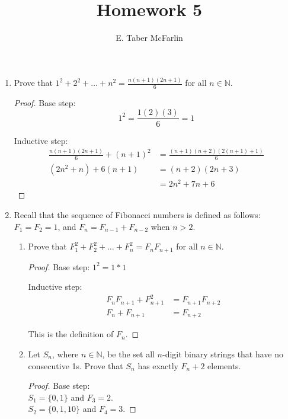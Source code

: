 \documentclass[12pt,a4paper,reqno,parskip=full]{amsart}
\numberwithin{equation}{section}
\theoremstyle{plain}
\theoremstyle{definition}
\begin{document}
\title{Homework 5}

\author{E. Taber McFarlin}

\maketitle

\begin{enumerate}
  \item Prove that $\displaystyle1^2+2^2+\ldots+n^2=\frac{n(n+1)(2n+1)}{6}$ for all $n\in\mathbb{N}$.
        \begin{proof} Base step:
          \[1^2 = \frac{1(2)(3)}{6} = 1\]

          Inductive step:
          \begin{align*}
            \frac{n(n + 1)(2n + 1)}{6} + (n + 1)^2 & = \frac{(n + 1)(n + 2)(2(n + 1) + 1)}{6} \\
            (2n^2 + n) + 6(n + 1)                  & = (n + 2)(2n + 3)                        \\
                                                   & = 2n^2 + 7n + 6
          \end{align*}
        \end{proof}

  \item Recall that the sequence of Fibonacci numbers is defined as follows: $F_1=F_2=1$,
        and $F_n=F_{n-1}+F_{n-2}$ when $n>2$.
        \begin{enumerate}
          \item Prove that $F_1^2+F_2^2+\ldots+F_n^2=F_nF_{n+1}$ for all $n\in\mathbb{N}$.
                \begin{proof} Base step: $1^2 = 1 * 1$

                  Inductive step:
                  \begin{align*}
                    F_nF_{n + 1} + F_{n + 1}^2 & = F_{n + 1}F_{n + 2} \\
                    F_n + F_{n + 1}            & = F_{n + 2}
                  \end{align*}

                  This is the definition of $F_n$.
                \end{proof}

          \item Let $S_n$, where $n\in\mathbb{N}$, be the set all $n$-digit binary strings that have no consecutive 1s. Prove that $S_n$ has exactly $F_n+2$ elements.
                \begin{proof} Base step: \\
                  $S_1 = \{0, 1\}$ and $F_3 = 2$. \\
                  $S_2 = \{0, 1, 10\}$ and $F_4 = 3$.


\end{proof}
\end{enumerate}
\end{enumerate}
\end{document}
